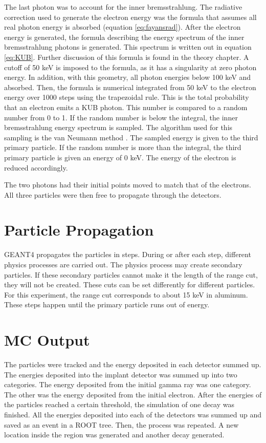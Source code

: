The last photon was to account for the inner bremsstrahlung.
The radiative correction used to generate the electron energy was the formula that assumes all real photon energy is absorbed (equation \ref{eq:fayansrad}).
After the electron energy is generated, the formula describing the energy spectrum of the inner bremsstrahlung photons is generated. 
This spectrum is written out in equation \ref{eq:KUB}. %
Further discussion of this formula is found in the theory chapter.
A cutoff of 50 keV is imposed to the formula, as it has a singularity at zero photon energy.
In addition, with this geometry, all photon energies below 100 keV and absorbed.
Then, the formula is numerical integrated from 50 keV to the electron energy over 1000 steps using the trapezoidal rule.
This is the total probability that an electron emits a KUB photon.
This number is compared to a random number from 0 to 1.
If the random number is below the integral, the inner bremsstrahlung energy spectrum is sampled.
The algorithm used for this sampling is the van Neumann method \cite{neu51}.
The sampled energy is given to the third primary particle.
If the random number is more than the integral, the third primary particle is given an energy of 0 keV.
The energy of the electron is reduced accordingly.

The two photons had their initial points moved to match that of the electrons.
All three particles were then free to propagate through the detectors.

\section{Particle Propagation}  
GEANT4 propagates the particles in steps.
During or after each step, different physics processes are carried out.
The physics process may create secondary particles.
If these secondary particles cannot make it the length of the range cut, they will not be created.
These cuts can be set differently for different particles.
For this experiment, the range cut corresponds to about 15 keV in aluminum.
These steps happen until the primary particle runs out of energy.

\section{MC Output}
The particles were tracked and the energy deposited in each detector summed up.
The energies deposited into the implant detector was summed up into two categories.
The energy deposited from the initial gamma ray was one category.
The other was the energy deposited from the initial electron.
After the energies of the particles reached a certain threshold, the simulation of one decay was finished.
All the energies deposited into each of the detectors was summed up and saved as an event in a ROOT tree.
Then, the process was repeated.
A new location inside the region was generated and another decay generated.

